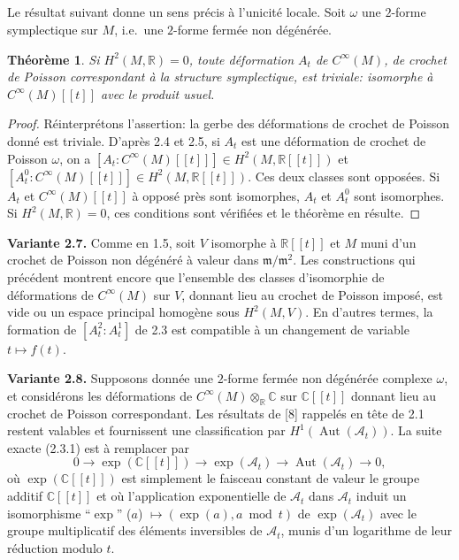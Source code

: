 \documentclass[11pt,a4paper]{article}
\theoremstyle{plain}
\newtheorem{theorem}{Th\'eor\`eme}[section]
\theoremstyle{definition}
\DeclareMathOperator{\Aut}{Aut}
\newcommand{\R}{\mathbb{R}}
\newcommand{\C}{\mathbb{C}}
\begin{document}
\subsection{}
Le r\'esultat suivant donne un sens pr\'ecis \`a l'unicit\'e locale. Soit $\omega$ une $2$-forme symplectique sur $M$, i.e.\ une $2$-forme ferm\'ee non d\'eg\'en\'er\'ee.

\begin{theorem}
Si $H^{2}(M, \R) = 0$, toute d\'eformation $A_{t}$ de $C^{\infty}(M)$, de crochet de Poisson
correspondant \`a la structure symplectique, est triviale: isomorphe \`a $C^{\infty}(M)[[t]]$ avec
le produit usuel.
\end{theorem}

\begin{proof}
R\'einterpr\'etons l'assertion: la gerbe des d\'eformations de crochet de Poisson donn\'e est
triviale. D'apr\`es 2.4 et 2.5, si $A_{t}$ est une d\'eformation de crochet de Poisson $\omega$,
on a $[A_{t} : C^{\infty}(M)[[t]]] \in H^{2}(M, \R[[t]])$ et $[A_{t}^{0} : C^{\infty}(M)[[t]]] \in H^{2}(M, \R[[t]])$. Ces deux classes sont oppos\'ees. Si $A_{t}$ et $C^{\infty}(M)[[t]]$ \`a oppos\'e pr\`es sont isomorphes, $A_{t}$ et $A_{t}^{0}$ sont isomorphes. Si $H^{2}(M, \R) = 0$, ces conditions sont v\'erifi\'ees et le th\'eor\`eme en r\'esulte.
\end{proof}

\noindent \textbf{Variante 2.7.} Comme en 1.5, soit $V$ isomorphe \`a $\R[[t]]$ et $M$ muni d'un crochet de Poisson non d\'eg\'en\'er\'e \`a valeur dans $\mathfrak{m}/\mathfrak{m}^{2}$. Les constructions qui pr\'ec\'edent montrent encore que l'ensemble des classes d'isomorphie de d\'eformations de $C^{\infty}(M)$
sur $V$, donnant lieu au crochet de Poisson impos\'e, est vide ou un espace principal homog\`ene sous $H^{2}(M, V)$. En d'autres termes, la formation de $[A_{t}^{2} : A_{t}^{1}]$ de 2.3 est compatible \`a un changement de variable $t \mapsto f(t)$.

\noindent \textbf{Variante 2.8.} Supposons donn\'ee une $2$-forme ferm\'ee non d\'eg\'en\'er\'ee complexe $\omega$,
et consid\'erons les d\'eformations de $C^{\infty}(M) \otimes_{\R} \C$ sur $\C[[t]]$ donnant lieu au crochet de Poisson correspondant. Les r\'esultats de [8] rappel\'es en t\^ete de 2.1 restent valables et fournissent une classification par $H^{1}(\Aut(\mathcal{A}_{t}))$. La suite exacte (2.3.1) est \`a remplacer par
\begin{equation}
0 \longrightarrow \exp(\C[[t]]) \longrightarrow \exp(\mathcal{A}_{t}) \longrightarrow \Aut(\mathcal{A}_{t}) \longrightarrow 0, \tag{2.8.1}
\end{equation}
o\`u $\exp(\C[[t]])$ est simplement le faisceau constant de valeur le groupe additif $\C[[t]]$ et o\`u l'application exponentielle de $\mathcal{A}_{t}$ dans $\mathcal{A}_{t}$ induit un isomorphisme ``$\exp$'' ($a$) $\mapsto (\exp(a), a \bmod t)$ de $\exp(\mathcal{A}_{t})$ avec le groupe multiplicatif des \'el\'ements inversibles de $\mathcal{A}_{t}$, munis d'un logarithme de leur r\'eduction modulo $t$.
\end{document}
